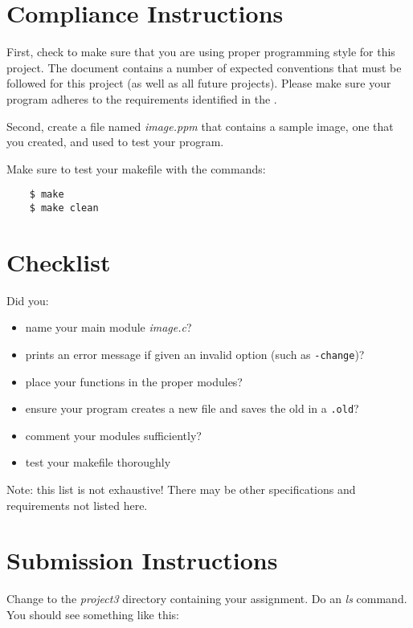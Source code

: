 \documentclass[12pt]{article}
\begin{document}
\section*{Compliance Instructions}

First, check to make sure that you are using proper programming
style for this project.  The document
 contains a number of expected
conventions that must be followed for this project (as well as all
future projects).  Please make sure your program adheres to the
requirements identified in the 
.

Second, create a file named {\it image.ppm} that contains a sample image, one
that you created, and used to test your program.

Make sure to test your makefile with the commands:

\begin{verbatim}
    $ make
    $ make clean
\end{verbatim}

\section*{Checklist}

Did you:

\begin{itemize}
\item
    name your main module {\it image.c}?
\item
    prints an error message if given an invalid option (such as {\tt -change})?
\item
    place your functions in the proper modules?
\item
    ensure your program creates a new file and saves the old in a {\tt .old}?
\item
    comment your modules sufficiently?
\item
    test your makefile thoroughly
\end{itemize}

Note: this list is not exhaustive! There may be other specifications
and requirements not listed here.

\section*{Submission Instructions}

Change to the {\it project3} directory containing your assignment.  Do an
{\it ls} command. You should see something like this:
\end{document}
